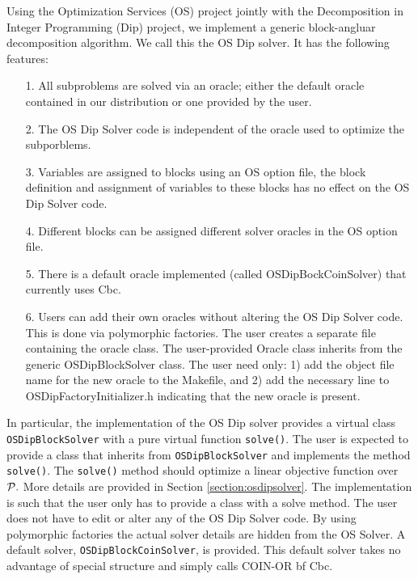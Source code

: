\documentclass[11pt]{article}
\begin{document}
Using the Optimization Services (OS) project jointly with the Decomposition in
Integer Programming (Dip) project, we implement a generic block-angluar
decomposition algorithm. We call this the OS Dip solver.  It has the following
features:

\begin{itemize}
\item[1.]  All subproblems are solved via an oracle; either the default oracle
contained in our distribution or one provided by the user.

\item[2.] The OS Dip Solver code is independent of the oracle used to optimize
the subporblems.

\item[3.] Variables are assigned to blocks using an OS option file, the block
definition and  assignment of variables to these blocks has no effect on the OS
Dip Solver code.

\item[4.] Different blocks can be assigned different solver oracles in the OS
option file.

\item[5.] There is a default oracle implemented (called OSDipBockCoinSolver)
that currently uses Cbc.

\item[6.] Users can add their own oracles without altering the OS Dip Solver
code. This is done via polymorphic factories. The user creates a separate file containing
the oracle class. The user-provided Oracle class  inherits from the generic
OSDipBlockSolver class. The user need only: 1) add the object file name for the
new oracle to the Makefile, and 2) add the necessary line to
OSDipFactoryInitializer.h indicating that the new oracle is present. 

\end{itemize}

In particular, the  implementation of the OS Dip solver provides a virtual class
{\tt OSDipBlockSolver} with a pure virtual function {\tt solve()}.  The user is
expected to provide a class that inherits from {\tt OSDipBlockSolver} and
implements the method {\tt solve()}.  The {\tt solve()} method should optimize a
linear objective function over ${\cal P}.$ More details are provided in Section
\ref{section:osdipsolver}. The implementation is such  that the user only has to
provide a class with a solve method. The user does not have to edit or alter 
any of the OS Dip Solver code.
By using polymorphic factories the actual solver details are hidden from the OS
Solver.  A default solver, {\tt OSDipBlockCoinSolver}, is provided. This default
solver takes no advantage of special structure and simply calls COIN-OR {bf
Cbc.}
 
\end{document}
